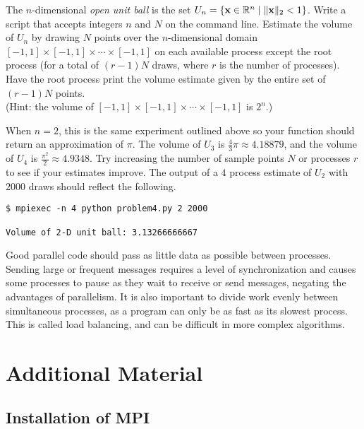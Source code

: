 \begin{problem}
The $n$-dimensional \emph{open unit ball} is the set $U_n = \{\mathbf{x}\in\mathbb{R}^n\mid \|\mathbf{x}\|_2 < 1\}$.
Write a script that accepts integers $n$ and $N$ on the command line.
Estimate the volume of $U_n$ by drawing $N$ points over the $n$-dimensional domain $[-1,1]\times[-1,1]\times\cdots\times[-1,1]$ on each available process except the root process (for a total of $(r-1)N$ draws, where $r$ is the number of processes).
Have the root process print the volume estimate given by the entire set of $(r-1)N$ points.
\\(Hint: the volume of $[-1,1]\times[-1,1]\times\cdots\times[-1,1]$ is $2^n$.)

When $n=2$, this is the same experiment outlined above so your function should return an approximation of $\pi$.
The volume of $U_3$ is $\frac{4}{3}\pi \approx 4.18879$, and the volume of $U_4$ is $\frac{\pi^2}{2} \approx 4.9348$.
Try increasing the number of sample points $N$ or processes $r$ to see if your estimates improve.
The output of a $4$ process estimate of $U_2$ with $2000$ draws should reflect the following.
\begin{lstlisting}[style=ShellOutput]
$ mpiexec -n 4 python problem4.py 2 2000

Volume of 2-D unit ball: 3.13266666667
\end{lstlisting}
\end{problem}

\begin{info}
Good parallel code should pass as little data as possible between processes.
Sending large or frequent messages requires a level of synchronization and causes some processes to pause as they wait to receive or send messages, negating the advantages of parallelism.
It is also important to divide work evenly between simultaneous processes, as a program can only be as fast as its slowest process.
This is called load balancing, and can be difficult in more complex algorithms.
\end{info}

\section*{Additional Material} %

\subsection*{Installation of MPI}

